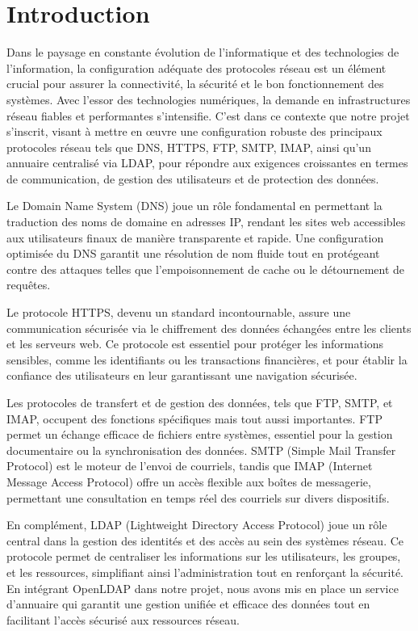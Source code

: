 	\newpage
	
	\renewcommand{\thesection}{\Roman{section}}  %
		\section{Introduction}
Dans le paysage en constante évolution de l'informatique et des technologies de l'information, la configuration adéquate des protocoles réseau est un élément crucial pour assurer la connectivité, la sécurité et le bon fonctionnement des systèmes. Avec l'essor des technologies numériques, la demande en infrastructures réseau fiables et performantes s'intensifie. C'est dans ce contexte que notre projet s'inscrit, visant à mettre en œuvre une configuration robuste des principaux protocoles réseau tels que DNS, HTTPS, FTP, SMTP, IMAP, ainsi qu’un annuaire centralisé via LDAP, pour répondre aux exigences croissantes en termes de communication, de gestion des utilisateurs et de protection des données.

Le Domain Name System (DNS) joue un rôle fondamental en permettant la traduction des noms de domaine en adresses IP, rendant les sites web accessibles aux utilisateurs finaux de manière transparente et rapide. Une configuration optimisée du DNS garantit une résolution de nom fluide tout en protégeant contre des attaques telles que l’empoisonnement de cache ou le détournement de requêtes.

Le protocole HTTPS, devenu un standard incontournable, assure une communication sécurisée via le chiffrement des données échangées entre les clients et les serveurs web. Ce protocole est essentiel pour protéger les informations sensibles, comme les identifiants ou les transactions financières, et pour établir la confiance des utilisateurs en leur garantissant une navigation sécurisée.

Les protocoles de transfert et de gestion des données, tels que FTP, SMTP, et IMAP, occupent des fonctions spécifiques mais tout aussi importantes. FTP permet un échange efficace de fichiers entre systèmes, essentiel pour la gestion documentaire ou la synchronisation des données. SMTP (Simple Mail Transfer Protocol) est le moteur de l’envoi de courriels, tandis que IMAP (Internet Message Access Protocol) offre un accès flexible aux boîtes de messagerie, permettant une consultation en temps réel des courriels sur divers dispositifs.

En complément, LDAP (Lightweight Directory Access Protocol) joue un rôle central dans la gestion des identités et des accès au sein des systèmes réseau. Ce protocole permet de centraliser les informations sur les utilisateurs, les groupes, et les ressources, simplifiant ainsi l'administration tout en renforçant la sécurité. En intégrant OpenLDAP dans notre projet, nous avons mis en place un service d'annuaire qui garantit une gestion unifiée et efficace des données tout en facilitant l'accès sécurisé aux ressources réseau.

